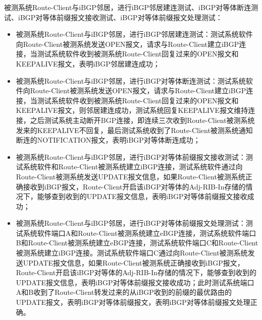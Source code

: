 被测系统Route-Client与iBGP邻居，进行iBGP邻居建连测试、iBGP对等体断连测试、iBGP对等体前缀报文接收测试、iBGP对等体前缀报文处理测试：
\begin{itemize}
  \item 被测系统Route-Client与iBGP邻居，进行iBGP邻居建连测试：测试系统软件向Route-Client被测系统发送OPEN报文，请求与Route-Client建立iBGP连接，当测试系统软件收到被测系统Route-Client回复过来的OPEN报文和KEEPALIVE报文，表明iBGP邻居建连成功；
  \item 被测系统Route-Client与iBGP邻居，进行iBGP对等体断连测试：测试系统软件向Route-Client被测系统发送OPEN报文，请求与Route-Client建立iBGP连接，当测试系统软件收到被测系统Route-Client回复过来的OPEN报文和KEEPALIVE报文，则邻居建连成功，测试系统回复KEEPALIVE报文维持连接，之后测试系统主动断开BGP连接，即连续三次收到Route-Client被测系统发来的KEEPALIVE不回复，最后测试系统收到了Route-Client被测系统通知断连的NOTIFICATION报文，表明iBGP对等体断连成功；
  \item 被测系统Route-Client与iBGP邻居，进行iBGP对等体前缀报文接收测试：测试系统软件和Route-Client被测系统建立iBGP连接，测试系统软件通过向Route-Client被测系统发送UPDATE报文信息，如果Route-Client被测系统正确接收到iBGP报文，Route-Client开启该iBGP对等体的Adj-RIB-In存储的情况下，能够查到收到的UPDATE报文信息，表明iBGP对等体前缀报文接收成功；
  \item 被测系统Route-Client与iBGP邻居，进行iBGP对等体前缀报文处理测试：测试系统软件端口A和Route-Client被测系统建立eBGP连接，测试系统软件端口B和Route-Client被测系统建立eBGP连接，测试系统软件端口C和Route-Client被测系统建立iBGP连接。测试系统软件端口C通过向Route-Client被测系统发送UPDATE报文信息，如果Route-Client被测系统正确接收到iBGP报文，Route-Client开启该iBGP对等体的Adj-RIB-In存储的情况下，能够查到收到的UPDATE报文信息，表明iBGP对等体前缀报文接收成功；此时测试系统端口A和B收到了Route-Client转发过来的从iBGP收到的前缀的最优路由的UPDATE报文，表明iBGP对等体前缀报文，表明iBGP对等体前缀报文处理正确。
\end{itemize}





